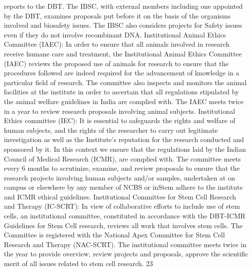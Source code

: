 \documentclass[a4paper,10pt]{article}
\begin{document}
reports to the DBT. The IBSC, with external members including one appointed by the DBT, examines proposals
put before it on the basis of the organisms involved and biosafety issues. The IBSC also considers projects for
Safety issues even if they do not involve recombinant DNA.
Institutional Animal Ethics Committee (IAEC): In order to ensure that all animals involved in research receive
humane care and treatment, the Institutional Animal Ethics Committee (IAEC) reviews the proposed use of
animals for research to ensure that the procedures followed are indeed required for the advancement of
knowledge in a particular field of research. The committee also inspects and monitors the animal facilities at the
institute in order to ascertain that all regulations stipulated by the animal welfare guidelines in India are complied
with. The IAEC meets twice in a year to review research proposals involving animal subjects.
Institutional Ethics committee (IEC): It is essential to safeguards the rights and welfare of human subjects,
and the rights of the researcher to carry out legitimate investigation as well as the Institute's reputation for the
research conducted and sponsored by it. In this context we ensure that the regulations laid by the Indian
Council of Medical Research (ICMR), are complied with. The committee meets every 6 months to scrutinize,
examine, and review proposals to ensure that the research projects involving human subjects and/or samples,
undertaken at on campus or elsewhere by any member of NCBS or inStem adhere to the institute and ICMR
ethical guidelines.
Institutional Committee for Stem Cell Research and Therapy (IC-SCRT): In view of collaborative efforts to
include use of stem cells, an institutional committee, constituted in accordance with the DBT-ICMR Guidelines
for Stem Cell research, reviews all work that involves stem cells. The Committee is registered with the National
Apex Committee for Stem Cell Research and Therapy (NAC-SCRT). The institutional committee meets twice in
the year to provide overview, review projects and proposals, approve the scientific merit of all issues related to
stem cell research.
23	
  
	
  
\end{document}
